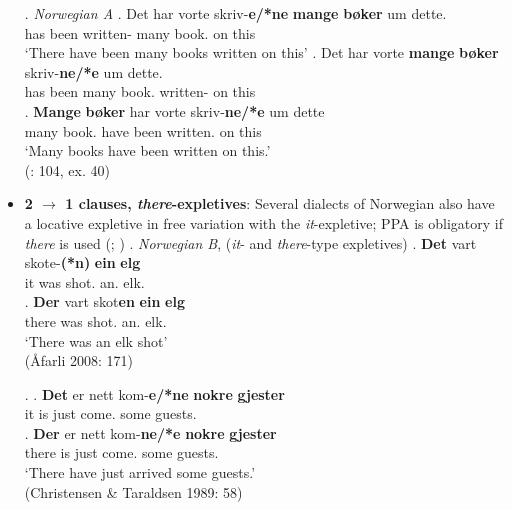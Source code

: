 \documentclass[letterpaper,10pt]{handout_nick}
\begin{document}
\begin{itemize}
\ex.\label{nor1} \emph{Norwegian A} 
\ag. Det har vorte skriv-{\bf e/*ne} {\bf mange} {\bf b\o ker} um dette.\\
 has been written- many book. on this\\
`There have been many books written on this'
\bg. Det har vorte {\bf mange} {\bf b\o ker} skriv-{\bf ne/*e} um dette.\\
 has been many book. written- on this\\
\bg. {\bf Mange} {\bf b\o ker} har vorte skriv-{\bf ne/*e} um dette\\
many book. have been written. on this\\
`Many books have been written on this.'\\
(\citealt{holmberg01}: 104, ex. 40)

\item {\bf 2 $\rightarrow$ 1 clauses, \emph{there}-expletives}: Several dialects of Norwegian also have a locative expletive in free variation with the \emph{it}-expletive; PPA is obligatory if \emph{there} is used (\citealt{christensen89}; \citealt{afarli08})
\ex. \emph{Norwegian B}, (\emph{it}- and \emph{there}-type expletives)
\ag. {\bf Det} vart skote-{\bf (*n)} {\bf ein} {\bf elg}\\
it was shot. an. elk.\\
\bg. {\bf Der} vart skot{\bf en} {\bf ein} {\bf elg}\\
there was shot. an. elk.\\
`There was an elk shot'\\
(\r{A}farli 2008: 171)

\ex. \ag. {\bf Det} er nett kom-{\bf e/*ne} {\bf nokre} {\bf gjester}\\
it is just come. some guests.\\ 
\bg. {\bf Der} er nett kom-{\bf ne/*e} {\bf nokre} {\bf gjester}\\
there is just come. some guests.\\
`There have just arrived some guests.'\\
(Christensen \& Taraldsen 1989: 58)

\begin{comment}

\end{comment}
\end{itemize}
\end{document}
